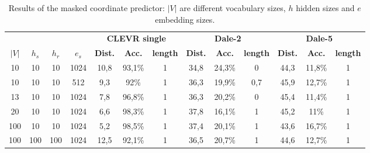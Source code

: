 \begin{table}[ht]
    \centering
    \begin{tabular}{cccc|ccc|ccc|ccc}
        \toprule
              &         &         &         & \multicolumn{3}{c}{\textbf{CLEVR single}} & \multicolumn{3}{c}{\textbf{Dale-2}} & \multicolumn{3}{c}{\textbf{Dale-5}}                                                                                                       \\\cmidrule(lr){5-7}\cmidrule(lr){8-10}\cmidrule(lr){11-13}
        $|V|$ & $h_{s}$ & $h_{r}$ & $e_{s}$ & \textbf{Dist.}                            & \textbf{Acc.}                       & \textbf{length}                     & \textbf{Dist.} & \textbf{Acc.} & \textbf{length} & \textbf{Dist.} & \textbf{Acc.} & \textbf{length} \\\midrule
        {10}  & {10}    & {10}    & {1024}  & {10,8}                                    & {93,1\%}                            & {1}                                 & {34,8}         & {24,3\%}      & {0}             & {44,3}         & {11,8\%}      & {1}             \\
        {10}  & {10}    & {10}    & {512}   & {9,3}                                     & {92\%}                              & {1}                                 & {36,3}         & {19,9\%}      & {0,7}           & {45,9}         & {12,7\%}      & {1}             \\
        {13}  & {10}    & {10}    & {1024}  & {7,8}                                     & {96,8\%}                            & {1}                                 & {36,3}         & {20,2\%}      & {0}             & {45,4}         & {11,4\%}      & {1}             \\
        {20}  & {10}    & {10}    & {1024}  & {6,6}                                     & {98,3\%}                            & {1}                                 & {37,8}         & {16,1\%}      & {1}             & {45,2}         & {11\%}        & {1}             \\
        {100} & {10}    & {10}    & {1024}  & {5,2}                                     & {98,5\%}                            & {1}                                 & {37,4}         & {20,1\%}      & {1}             & {43,6}         & {16,7\%}      & {1}             \\
        {100} & {100}   & {100}   & {1024}  & {12,5}                                    & {92,1\%}                            & {1}                                 & {36,5}         & {20,7\%}      & {1}             & {44,6}         & {12,7\%}      & {1}             \\
        \bottomrule
    \end{tabular}
    \caption{Results of the masked coordinate predictor: $|V|$ are different vocabulary sizes, $h$ hidden sizes and $e$ embedding sizes.}
    \label{tab:results_masked_predictor_game}
\end{table}

